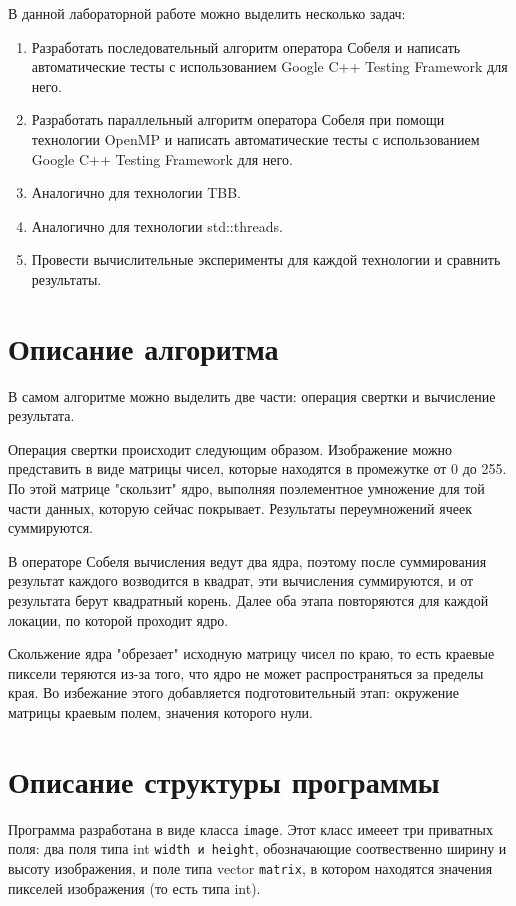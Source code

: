 \documentclass[14pt, a4paper]{extreport}
\begin{document}
В данной лабораторной работе можно выделить несколько задач:
 \begin{enumerate} 
 \item Разработать последовательный алгоритм оператора Собеля и написать автоматические тесты с использованием Google C++ Testing Framework для него.
 \item Разработать параллельный алгоритм оператора Собеля при помощи технологии OpenMP и написать автоматические тесты с использованием Google C++ Testing Framework для него.
 \item Аналогично для технологии TBB.
 \item Аналогично для технологии std::threads.
 \item Провести вычислительные эксперименты для каждой технологии и сравнить результаты.
 \end{enumerate}


\newpage 
\section*{Описание алгоритма}
В самом алгоритме можно выделить две части: операция свертки и вычисление результата. 

Операция свертки происходит следующим образом. Изображение можно представить в виде матрицы чисел, которые находятся в промежутке от 0 до 255. По этой матрице "скользит" ядро, выполняя поэлементное умножение для той части данных, которую сейчас покрывает. Результаты переумножений ячеек суммируются.

В операторе Собеля вычисления ведут два ядра, поэтому после суммирования результат каждого возводится в квадрат, эти вычисления суммируются, и от результата берут квадратный корень. Далее оба этапа повторяются для каждой локации, по которой проходит ядро.

Скольжение ядра "обрезает" исходную матрицу чисел по краю, то есть краевые пиксели теряются из-за того, что ядро не может распространяться за пределы края. Во избежание этого добавляется подготовительный этап: окружение матрицы краевым полем, значения которого нули.
\newpage 

\section*{Описание структуры программы}

Программа разработана в виде класса \verb|image|. Этот класс имееет три приватных поля: два поля типа int \verb|width и height|, обозначающие соотвественно ширину и высоту изображения, и поле типа vector \verb|matrix|, в котором находятся значения пикселей изображения (то есть типа int).
\end{document}
